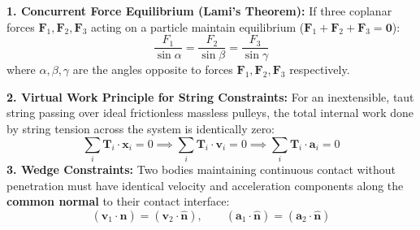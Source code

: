 \documentclass[10pt,twoside,openright]{book}
\begin{document}
\begin{formulabox}
\textbf{1. Concurrent Force Equilibrium (Lami's Theorem):} If three coplanar forces $\mathbf{F}_1, \mathbf{F}_2, \mathbf{F}_3$ acting on a particle maintain equilibrium ($\mathbf{F}_1 + \mathbf{F}_2 + \mathbf{F}_3 = \mathbf{0}$):
\begin{equation}
  \frac{F_1}{\sin\alpha} = \frac{F_2}{\sin\beta} = \frac{F_3}{\sin\gamma}
\end{equation}
where $\alpha, \beta, \gamma$ are the angles opposite to forces $\mathbf{F}_1, \mathbf{F}_2, \mathbf{F}_3$ respectively.

\textbf{2. Virtual Work Principle for String Constraints:} For an inextensible, taut string passing over ideal frictionless massless pulleys, the total internal work done by string tension across the system is identically zero:
\begin{equation}
  \sum_{i} \mathbf{T}_i \cdot \mathbf{x}_i = 0 \implies \sum_{i} \mathbf{T}_i \cdot \mathbf{v}_i = 0 \implies \sum_{i} \mathbf{T}_i \cdot \mathbf{a}_i = 0
\end{equation}
\textbf{3. Wedge Constraints:} Two bodies maintaining continuous contact without penetration must have identical velocity and acceleration components along the \textbf{common normal} to their contact interface:
\begin{equation}
  (\mathbf{v}_1 \cdot \hat{\mathbf{n}}) = (\mathbf{v}_2 \cdot \hat{\mathbf{n}}), \qquad (\mathbf{a}_1 \cdot \hat{\mathbf{n}}) = (\mathbf{a}_2 \cdot \hat{\mathbf{n}})
\end{equation}
\end{formulabox}
\end{document}
